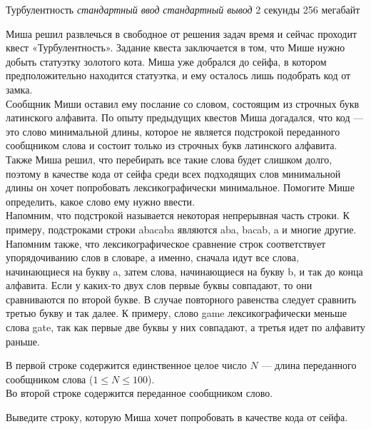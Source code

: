 \begin{problem}%
{Турбулентность}%
{\textsl{стандартный ввод}}%
{\textsl{стандартный вывод}}%
{2 секунды}%
{256 мегабайт}{}

Миша решил развлечься в свободное от решения задач время и сейчас проходит квест «Турбулентность». Задание квеста заключается в том, что Мише нужно добыть статуэтку золотого кота. Миша уже добрался до сейфа, в котором предположительно находится статуэтка, и ему осталось лишь подобрать код от замка.\\

Сообщник Миши оставил ему послание со словом, состоящим из строчных букв латинского алфавита. По опыту предыдущих квестов Миша догадался, что код — это слово минимальной длины, которое не является подстрокой переданного сообщником слова и состоит только из строчных букв латинского алфавита.\\

Также Миша решил, что перебирать все такие слова будет слишком долго, поэтому в качестве кода от сейфа среди всех подходящих слов минимальной длины он хочет попробовать лексикографически минимальное. Помогите Мише определить, какое слово ему нужно ввести.\\

Напомним, что подстрокой называется некоторая непрерывная часть строки. К примеру, подстроками строки abacaba являются aba, bacab, a и многие другие.\\

Напомним также, что лексикографическое сравнение строк соответствует упорядочиванию слов в словаре, а именно, сначала идут все слова, начинающиеся на букву a, затем слова, начинающиеся на букву b, и так до конца алфавита. Если у каких-то двух слов первые буквы совпадают, то они сравниваются по второй букве. В случае повторного равенства следует сравнить третью букву и так далее. К примеру, слово game лексикографически меньше слова gate, так как первые две буквы у них совпадают, а третья идет по алфавиту раньше.

\InputFile

В первой строке содержится единственное целое число $N$ — длина переданного сообщником слова ($1 \le N \le 100$).\\

Во второй строке содержится переданное сообщником слово.

\OutputFile

Выведите строку, которую Миша хочет попробовать в качестве кода от сейфа.

\Examples

\begin{example}
%
%
\end{example}
\end{problem}
